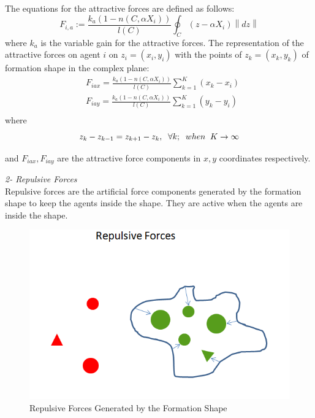 \documentclass[twoside]{article}
\newcommand{\norm}[1]{\left\lVert#1\right\rVert}
\begin{document}
The equations for the attractive forces are defined as follows:			
			\begin{equation}
F_{i,a} := \frac{k_a (1-n(C,\alpha X_i))}{l(C)} \oint_C(z-\alpha X_i)\norm{dz}
			\end{equation}
			where $k_a$ is the variable gain for the attractive forces. The representation of the attractive forces on agent $i$ on $z_i = (x_i, y_i)$ with the points of  $z_k = (x_k,y_k)$ of formation shape in the complex plane:
			\begin{align*}
& F_{iax} =\frac{k_a (1-n(C,\alpha X_i))}{l(C)}  \sum_{k=1}^{K} (x_k  - x_i)\\
& F_{iay} =\frac{k_a (1-n(C,\alpha X_i))}{l(C)}  \sum_{k=1}^{K} (y_k  - y_i)\\
			\end{align*}
			where
		\begin{equation}
		z_k - z_{k-1} = z_{k+1} - z_k, \hspace{0.2cm}  \forall k ;  \hspace{0.2cm} when  \hspace{0.2cm} K \to\infty
		\end{equation}
			
			and $F_{iax} , F_{iay} $ are the attractive force components in $x,y$ coordinates respectively.\newline
			
					\textit{	2- Repulsive Forces} \\ 
		
			Repulsive forces are the artificial force components generated by the formation shape to keep the agents inside the shape. They are active when the agents are inside the shape. 
					
							\begin{figure}[H]
								\caption{Repulsive Forces Generated by the Formation Shape}
								\centering
								\includegraphics[scale = 0.60]{repulsive_forces}
							\end{figure}
							
\end{document}
